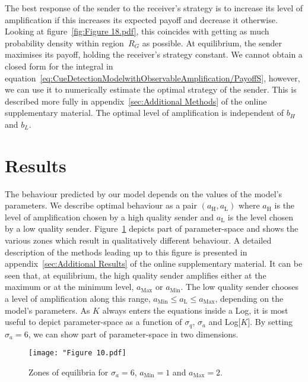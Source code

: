 \documentclass[a4paper,12pt]{article}
\numberwithin{equation}{section}
\numberwithin{figure}{section}
\begin{document}
The best response of the sender to the receiver's strategy is to increase its level of amplification if this increases its expected payoff and decrease it otherwise. Looking at figure~\ref{fig:Figure 18.pdf}, this coincides with getting as much probability density within region~$R_G$ as possible. At equilibrium, the sender maximises its payoff, holding the receiver's strategy constant. We cannot obtain a closed form for the integral in equation~\ref{eq:CueDetectionModelwithObservableAmplification/PayoffS}, however, we can use it to numerically estimate the optimal strategy of the sender. This is described more fully in appendix~\ref{sec:Additional Methods} of the online supplementary material. The optimal level of amplification is independent of $b_{H}$ and $b_{L}$.

\newpage


\section{Results}
\label{sec:Results}

The behaviour predicted by our model depends on the values of the model's parameters. We describe optimal behaviour as a pair $(a_{\text{H}}, a_{\text{L}})$ where $a_{\text{H}}$ is the level of amplification chosen by a high quality sender and $a_{\text{L}}$ is the level chosen by a low quality sender. Figure~\ref{fig:Figure 10.pdf} depicts part of parameter-space and shows the various zones which result in qualitatively different behaviour. A detailed description of the methods leading up to this figure is presented in appendix~\ref{sec:Additional Results} of the online supplementary material. It can be seen that, at equilibrium, the high quality sender amplifies either at the maximum or at the minimum level, $a_{\text{Max}}$ or $a_{\text{Min}}$. The low quality sender chooses a level of amplification along this range, $a_{\text{Min}} \leq a_{\text{L}} \leq a_{\text{Max}}$, depending on the model's parameters. As $K$ always enters the equations inside a Log, it is most useful to depict parameter-space as a function of $\sigma_{q}$, $\sigma_{a}$ and Log[$K$]. By setting $\sigma_{a}=6$, we can show part of parameter-space in two dimensions.

\begin{figure}[!h]
\begin{center}
\leavevmode
\texttt{[image: "Figure 10.pdf]}
\caption[Zones of equilibria in parameter-space]{Zones of equilibria for $\sigma_{a}=6$, $a_{\text{Min}}=1$ and $a_{\text{Max}}=2$.}
\label{fig:Figure 10.pdf}
\end{center}
\end{figure}
\end{document}
